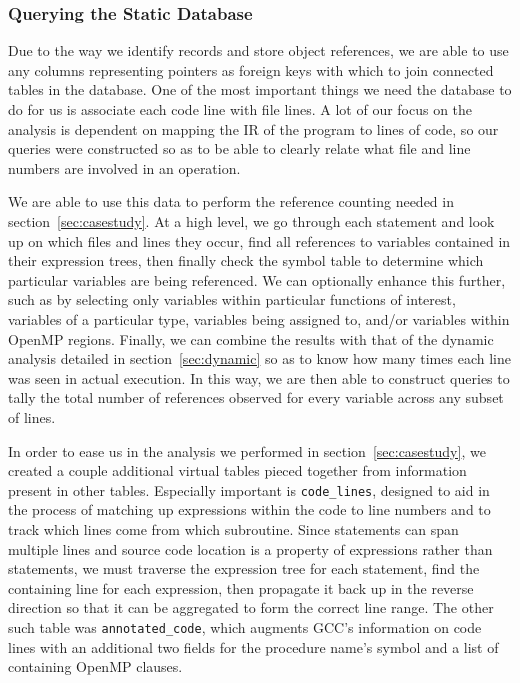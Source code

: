 \subsubsection{Querying the Static Database}
\label{sec:querying}
Due to the way we identify records and store object references, we are able to use any columns 
representing pointers as foreign keys with which to join connected tables in the database.
One of the most important things we need the database to do for us is associate each code line with 
file lines. A lot of our focus on the analysis is dependent on mapping the \ac{IR} of the program to lines of code, so our queries were 
constructed so as to be able to clearly relate what file and line numbers are involved in an operation.

We are able to use this data to perform the reference counting needed in 
section~\ref{sec:casestudy}.
At a high level, we go through each statement and look up on which files and lines they occur, find all 
references to variables contained in their expression trees, then finally check the symbol table to 
determine which particular variables are being referenced.
We can optionally enhance this further, such as by selecting only variables within particular functions 
of interest, variables of a particular type, variables being assigned to, and/or variables within 
OpenMP regions.
Finally, we can combine the results with that of the dynamic analysis detailed in 
section~\ref{sec:dynamic} so as to know how many times each line was seen in actual execution.
In this way, we are then able to construct queries to tally the total number of references observed for 
every variable across any subset of lines.

In order to ease us in the analysis we performed in section~\ref{sec:casestudy}, we created a couple 
additional virtual tables pieced together from information present in other tables.
Especially important is \texttt{code\_lines}, designed to aid in the process of matching up 
expressions within the code to line numbers and to track which lines come from which subroutine.
Since statements can span multiple lines and source code location is a property of expressions 
rather than statements, we must traverse the expression tree for each statement, find the containing 
line for each expression, then propagate it back up in the reverse direction so that it can be 
aggregated to form the correct line range.
The other such table was \texttt{annotated\_code}, which augments \acs{GCC}'s information on code 
lines with an additional two fields for the procedure name's symbol and a list of containing OpenMP 
clauses.

